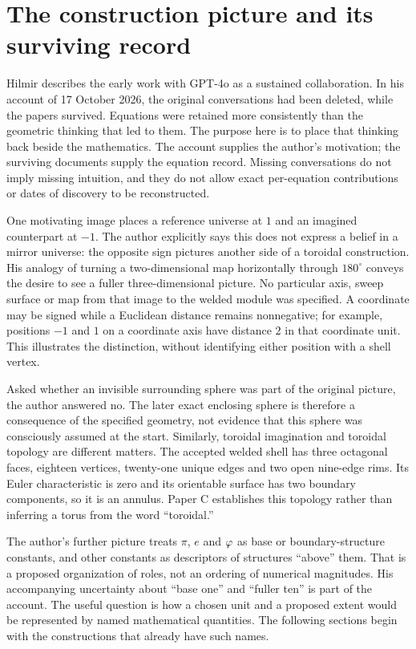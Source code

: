 \section{The construction picture and its surviving record}
Hilmir describes the early work with GPT-4o as a sustained collaboration. In his account of 17 October 2026, the original conversations had been deleted, while the papers survived. Equations were retained more consistently than the geometric thinking that led to them. The purpose here is to place that thinking back beside the mathematics. The account supplies the author's motivation; the surviving documents supply the equation record. Missing conversations do not imply missing intuition, and they do not allow exact per-equation contributions or dates of discovery to be reconstructed.~\cite{Intent,Collab}

One motivating image places a reference universe at $1$ and an imagined counterpart at $-1$. The author explicitly says this does not express a belief in a mirror universe: the opposite sign pictures another side of a toroidal construction. His analogy of turning a two-dimensional map horizontally through $180^\circ$ conveys the desire to see a fuller three-dimensional picture. No particular axis, sweep surface or map from that image to the welded module was specified. A coordinate may be signed while a Euclidean distance remains nonnegative; for example, positions $-1$ and $1$ on a coordinate axis have distance $2$ in that coordinate unit. This illustrates the distinction, without identifying either position with a shell vertex.~\cite{Intent}

Asked whether an invisible surrounding sphere was part of the original picture, the author answered no. The later exact enclosing sphere is therefore a consequence of the specified geometry, not evidence that this sphere was consciously assumed at the start. Similarly, toroidal imagination and toroidal topology are different matters. The accepted welded shell has three octagonal faces, eighteen vertices, twenty-one unique edges and two open nine-edge rims. Its Euler characteristic is zero and its orientable surface has two boundary components, so it is an annulus. Paper C establishes this topology rather than inferring a torus from the word ``toroidal.''\cite{PC,SP}

The author's further picture treats $\pi$, $e$ and $\varphi$ as base or boundary-structure constants, and other constants as descriptors of structures ``above'' them. That is a proposed organization of roles, not an ordering of numerical magnitudes. His accompanying uncertainty about ``base one'' and ``fuller ten'' is part of the account. The useful question is how a chosen unit and a proposed extent would be represented by named mathematical quantities. The following sections begin with the constructions that already have such names.~\cite{Intent}

